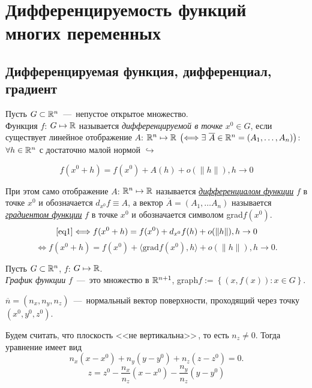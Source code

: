 \newpage

\section{Дифференцируемость функций многих переменных}

\subsection{Дифференцируемая функция, дифференциал, градиент}
\begin{definition}
    Пусть $G \subset \mathbb{R} ^n$~---~непустое открытое множество. \\ Функция $f$: $G \mapsto \mathbb{R}$ называется \textit{дифференцируемой в точке} $x^0 \in G$, если существует линейное отображение $A$: $\mathbb{R}^n \mapsto \mathbb{R}$  $\left( \Longleftrightarrow \exists \ \overline{A} \in \mathbb{R}^n = (A_{1}, \ldots, A_{n})\right) $: $\forall h \in \mathbb{R}^n$ с достаточно малой нормой $\hookrightarrow$

    \begin{equation}\label{eq1}\tag{$\star$}
         f(x^0 + h) = f(x^0) + A(h) + o(\|h\|), h \to 0 
    \end{equation}

    При этом само отображение $A$: $\mathbb{R}^n \mapsto \mathbb{R}$ называется \underline{\textit{дифференциалом функции}} $f$ в точке $x^0$ и обозначается $d_{x^0} f \equiv A$, а вектор $\overline{A} = \left(A_1, \ldots A_n \right)$ называется \underline{\textit{градиентом функции}} $f$ в точке $x^0$ и обозначается символом grad$f(x^0)$. \\

    $$ \eqref{eq1} \Longleftrightarrow f(x^0 + h) = f(x^0) + d_{x^0} f(h) + o(\|h\|), h \to 0 $$
    $$ \Longleftrightarrow f(x^0 + h) = f(x^0) + \langle \text{grad}f(x^0), h\rangle + o(\|h\|), h \to 0.$$
\end{definition}

\begin{definition}
    Пусть $G \subset \mathbb{R}^n$, $f$: $G \mapsto \mathbb{R}$. \\
    \textit{График функции} $f$~---~это множество в $\mathbb{R}^{n+1}$, graph$f := \left\{ (x, f(x)): x \in G\right\}$.
\end{definition}

$\overline{n} = (n_x, n_y, n_z)$~---~нормальный вектор поверхности, проходящий через точку $(x^0, y^0, z^0)$.

Будем считать, что плоскость <<не вертикальна>>\,, то есть $n_z \neq 0$. Тогда уравнение имеет вид $$n_x(x-x^0) + n_y(y-y^0) + n_z(z - z^0) = 0.$$
$$z = z^0 - \dfrac{n_x}{n_z}(x-x^0) - \dfrac{n_y}{n_z}(y - y^0)$$

